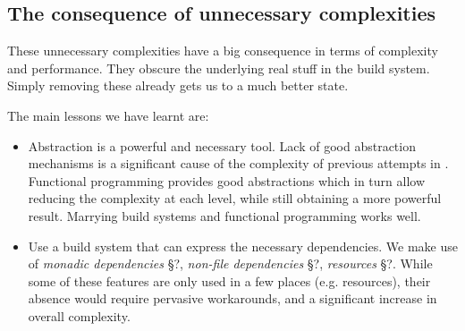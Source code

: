 \subsection{The consequence of unnecessary complexities}

These unnecessary complexities have a big consequence in terms of complexity and performance. They obscure the underlying real stuff in the build system. Simply removing these already gets us to a much better state.

The main lessons we have learnt are:

\begin{itemize}
\item Abstraction is a powerful and necessary tool. Lack of good abstraction mechanisms is a significant cause of the complexity of previous attempts in \make{}. Functional programming provides good abstractions which in turn allow reducing the complexity at each level, while still obtaining a more powerful result. Marrying build systems and functional programming works well.
\item Use a build system that can express the necessary dependencies. We make use of \textit{monadic dependencies} \S?, \textit{non-file dependencies} \S?, \textit{resources} \S?. While some of these features are only used in a few places (e.g. resources), their absence would require pervasive workarounds, and a significant increase in overall complexity.
\end{itemize}

